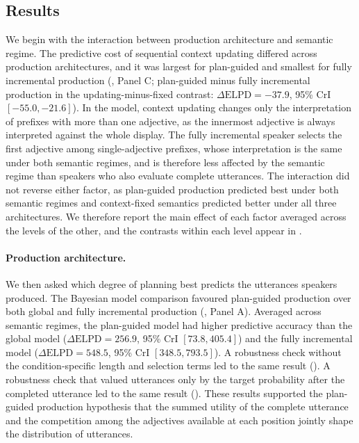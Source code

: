 \documentclass[10pt,a4paper,fleqn]{article}
\begin{document}
\subsection{Results}
\label{sec:modelcomparison:results}

We begin with the interaction between production architecture and semantic regime.
The predictive cost of sequential context updating differed across production architectures, and it was largest for plan-guided and smallest for fully incremental production (, Panel C; plan-guided minus fully incremental production in the updating-minus-fixed contrast: $\Delta\mathrm{ELPD}=-37.9$, 95\% CrI $[-55.0,-21.6]$).
In the model, context updating changes only the interpretation of prefixes with more than one adjective, as the innermost adjective is always interpreted against the whole display.
The fully incremental speaker selects the first adjective among single-adjective prefixes, whose interpretation is the same under both semantic regimes, and is therefore less affected by the semantic regime than speakers who also evaluate complete utterances.
The interaction did not reverse either factor, as plan-guided production predicted best under both semantic regimes and context-fixed semantics predicted better under all three architectures.
We therefore report the main effect of each factor averaged across the levels of the other, and the contrasts within each level appear in .

\paragraph{Production architecture.}
\label{sec:architecture-comparison}

We then asked which degree of planning best predicts the utterances speakers produced.
The Bayesian model comparison favoured plan-guided production over both global and fully incremental production (, Panel A).
Averaged across semantic regimes, the plan-guided model had higher predictive accuracy than the global model ($\Delta\mathrm{ELPD}=256.9$, 95\% CrI $[73.8,405.4]$) and the fully incremental model ($\Delta\mathrm{ELPD}=548.5$, 95\% CrI $[348.5,793.5]$).
A robustness check without the condition-specific length and selection terms led to the same result ().
A robustness check that valued utterances only by the target probability after the completed utterance led to the same result ().
These results supported the plan-guided production hypothesis that the summed utility of the complete utterance and the competition among the adjectives available at each position jointly shape the distribution of utterances.
\end{document}
